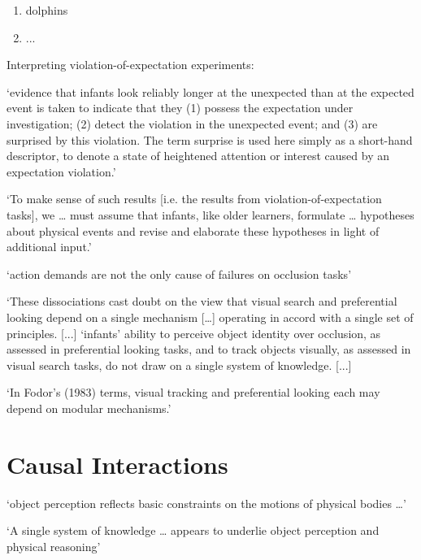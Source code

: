 \documentclass[12pt]{extarticle}
\begin{document}
\begin{multicols}{3}
\begin{enumerate}
\item dolphins \citep{jaakkola:2010_what}
 
\item ...
 
\end{enumerate}
 
Interpreting violation-of-expectation experiments:
 
‘evidence that infants look reliably longer at the unexpected than at the expected event is taken to indicate that they (1) possess the expectation under investigation; (2) detect the violation in the unexpected event; and (3) are surprised by this violation. The term surprise is used here simply as a short-hand descriptor, to denote a state of heightened attention or interest caused by an expectation violation.’
\citep[p.\ 168]{wang:2004_young}
 
‘To make sense of such results [i.e. the results from violation-of-expectation tasks], we … must assume that infants, like older learners, formulate … hypotheses about physical events and revise and elaborate these hypotheses in light of additional input.’
\citep[p.\ 329]{Aguiar:2002ob}
 
‘action demands are not the only cause of failures on occlusion tasks’
\citep[p.\ 291]{shinskey:2012_disappearing}
 
‘These dissociations cast doubt on the view that visual search and preferential looking depend on a single mechanism […] operating in accord with a single set of principles. [...]
‘infants’ ability to perceive object identity over occlusion, as assessed in preferential looking tasks, and to track objects visually, as assessed in visual search tasks, do not draw on a single system of knowledge. [...]
 
‘In Fodor’s (1983) terms, visual tracking and preferential looking each may depend on modular mechanisms.’
\citep[p.\ 137]{spelke:1995_spatiotemporal}
 
 
 
\section{Causal Interactions}
 
‘object perception reflects basic constraints on the motions of physical bodies …’
\citep[p.\ 51]{Spelke:1990jn}
 
‘A single system of knowledge … appears to underlie object perception and physical reasoning’
\citep[p.\ 175]{Carey:1994bh}
 

\end{multicols}
\end{document}
